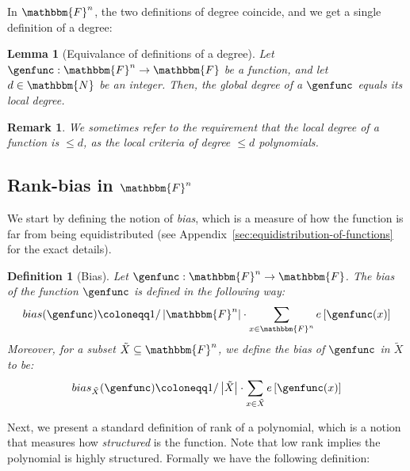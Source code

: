 \documentclass[10pt,a4paper]{article}
\newtheorem{definition}[theorem]{Definition}
\newtheorem{lemma}[theorem]{Lemma}
\newtheorem{remark}[theorem]{Remark}
\newcommand{\definedas}[0]{\coloneqq}
\newcommand{\sparens}[1]{\left[ #1 \right]}
\newcommand{\basefield}[0]{\mathbbm{F}}
\newcommand{\blocklength}[0]{n}
\newcommand{\field}[0]{\basefield^{\blocklength}}
\newcommand{\titlefield}[0]{\texorpdfstring{$\field$}{Fn}}
\newcommand{\degree}[0]{d}
\newcommand{\charfunc}[1]{e \sparens{#1}}
\newcommand{\funcdef}[3]{#1:#2\rightarrow#3}
\newcommand{\naturalnumbersset}[0]{\mathbbm{N}}
\newcommand{\variety}{{\tilde{X}}}
\newcommand{\bias}[1]{bias({#1})}
\newcommand{\relbias}[2]{bias_{#1}{({#2})}}
\newcommand{\abs}[1]{\left| #1 \right|}
\begin{document}
In $\field$, the two definitions of degree coincide, and we get a single definition of a degree:
\begin{lemma}[Equivalance of definitions of a degree]\label{lemma:alternative-definition-for-polynomial-using-derivatives}
    Let $\funcdef{\genfunc}{\field}{\basefield}$ be a function, and let $\degree \in \naturalnumbersset$ be an integer.
    Then, the global degree of a $\genfunc$ \emph{equals} its local degree.
\end{lemma}
\begin{remark}
    We sometimes refer to the requirement that the local degree of a function is $\leq \degree$,
    as the \emph{local criteria} of degree $\leq \degree$ polynomials.
\end{remark}

\subsection[Rank-bias in \titlefield]{Rank-bias in \titlefield}
We start by defining the notion of \emph{bias}, which is a measure of how the function is far from being equidistributed (see Appendix~\ref{sec:equidistribution-of-functions} for the exact details).
\begin{definition}[Bias]
    Let $\funcdef{\genfunc}{\field}{\basefield}$.
    The \emph{bias} of the function $\genfunc$ is defined in the following way:
    \[
        \bias{\genfunc} \definedas 1 / \abs{\field} \cdot \sum_{x \in \field}{\charfunc{\genfunc(x)}}
    \]
    Moreover, for a subset $\variety \subseteq \field$, we define the \emph{bias of $\genfunc$ in $\variety$} to be:
    \[
        \relbias{\variety}{\genfunc} \definedas 1 / \abs{\variety} \cdot \sum_{x \in \variety}{\charfunc{\genfunc(x)}}
    \]
\end{definition}
Next, we present a standard definition of rank of a polynomial, which is a notion that measures how \emph{structured} is the function.
Note that low rank implies the polynomial is highly structured.
Formally we have the following definition:
\end{document}
